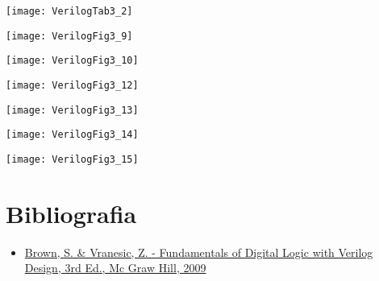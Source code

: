 \begin{frame}{\insertsection} \center
    \texttt{[image: VerilogTab3\_2]}
\end{frame}

\begin{frame}{\insertsection} \center
    \texttt{[image: VerilogFig3\_9]}
\end{frame}

\begin{frame}{\insertsection} \center
    \texttt{[image: VerilogFig3\_10]}
\end{frame}

\begin{frame}{\insertsection} \center
    \texttt{[image: VerilogFig3\_12]}
\end{frame}

\begin{frame}{\insertsection} \center
    \texttt{[image: VerilogFig3\_13]}
\end{frame}

\begin{frame}{\insertsection} \center
    \texttt{[image: VerilogFig3\_14]}
\end{frame}

\begin{frame}{\insertsection} \center
    \texttt{[image: VerilogFig3\_15]}
\end{frame}

\section{Bibliografia} %

\begin{frame}{\insertsection} 
	\begin{itemize}
		\item \href{https://www.google.com.br/search?q=filetype\%3Apdf+Fundamentals+of+Digital+Logic+with+Verilog+Design+&oq=filetype\%3Apdf}{Brown, S. \& Vranesic, Z. - Fundamentals of Digital Logic with Verilog Design, 3rd Ed., Mc Graw Hill, 2009}
	\end{itemize}
\end{frame}

\begin{frame}
	\titlepage
\end{frame} 


